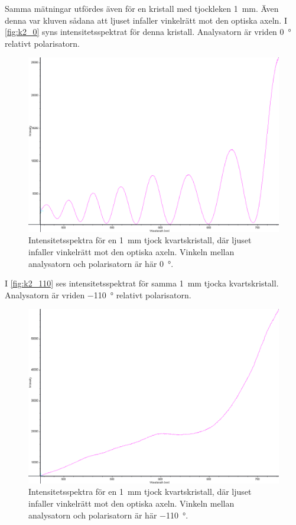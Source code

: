 \documentclass[a4paper]{article}
\begin{document}
Samma mätningar utfördes även för en kristall med tjockleken \SI{1}{\milli\m}. Även denna var kluven sådana att ljuset infaller vinkelrätt mot den optiska axeln. I \autoref{fig:k2_0} syns intensitetsspektrat för denna kristall. Analysatorn är vriden \SI{0}{\degree} relativt polarisatorn.

\FloatBarrier
\begin{figure}[ht!]
	\centering
	\includegraphics[width=\linewidth]{data/spektra_180_kristall2_0_inv}
	\caption{Intensitetsspektra för en \SI{1}{\milli\m} tjock kvartskristall, där ljuset infaller vinkelrätt mot den optiska axeln. Vinkeln mellan analysatorn och polarisatorn är här \SI{0}{\degree}.}
	\label{fig:k2_0}
\end{figure}
\FloatBarrier	

I \autoref{fig:k2_110} ses intensitetsspektrat för samma \SI{1}{\milli\m} tjocka kvartskristall. Analysatorn är vriden \SI{-110}{\degree} relativt polarisatorn.

\FloatBarrier
\begin{figure}[ht!]
	\centering
	\includegraphics[width=\linewidth]{data/spektra_180_kristall2_70_inv}
	\caption{Intensitetsspektra för en \SI{1}{\milli\m} tjock kvartskristall, där ljuset infaller vinkelrätt mot den optiska axeln. Vinkeln mellan analysatorn och polarisatorn är här \SI{-110}{\degree}.}
	\label{fig:k2_110}
\end{figure}
\FloatBarrier
\end{document}
